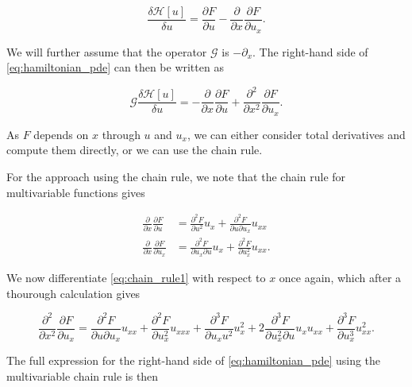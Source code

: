 \begin{equation}
    \frac{\delta \mathcal{H}[u]}{\delta u} = \frac{\partial F}{\partial u}  -  \frac{\partial}{\partial x} \frac{\partial F}{\partial u_x}.
    \label{eq:variational_derivative_simple}
\end{equation}

We will further assume that the operator \(\mathcal{G}\) is \(-\partial_x\). The right-hand side of \cref{eq:hamiltonian_pde} can then be written as

\begin{equation}
    \mathcal{G}\frac{\delta \mathcal{H}[u]}{\delta u} =  -\frac{\partial}{\partial x}\frac{\partial F}{\partial u}  +  \frac{\partial^2}{\partial x^2} \frac{\partial F}{\partial u_x}.
    \label{eq:rhs_pde_simplified}
\end{equation}

As \(F\) depends on \(x\) through \(u\) and \(u_x\), we can either consider total derivatives and compute them directly, or we can use the chain rule.

For the approach using the chain rule, we note that the chain rule for multivariable functions gives 

\begin{align}
    \frac{\partial}{\partial x}\frac{\partial F}{\partial u} &= \frac{\partial^2 F}{\partial u^2} u_x + \frac{\partial^2 F}{\partial u \partial u_x} u_{xx} \nonumber\\
    \frac{\partial}{\partial x}\frac{\partial F}{\partial u_x} &= \frac{\partial^2 F}{\partial u_x \partial u} u_x + \frac{\partial^2 F}{\partial u_x^2} u_{xx}.\label{eq:chain_rule1}
\end{align}

We now differentiate \cref{eq:chain_rule1} with respect to \(x\) once again, which after a thourough calculation gives

\begin{equation}
    \frac{\partial^2}{\partial x^2}\frac{\partial F}{\partial u_x}  = 
    \frac{\partial^2 F}{\partial u \partial u_x} u_{xx}
    +\frac{\partial^2 F}{\partial u_x^2} u_{xxx}
    +\frac{\partial^3 F}{\partial u_x u^2} u_x^2
    +2\frac{\partial^3 F}{\partial u_x^2 \partial u} u_x u_{xx}
    +\frac{\partial^3 F}{\partial u_x^3}  u_{xx}^2.
    \label{eq:chain_rule2}
\end{equation}

The full expression for the right-hand side of \cref{eq:hamiltonian_pde} using the multivariable chain rule is then 


